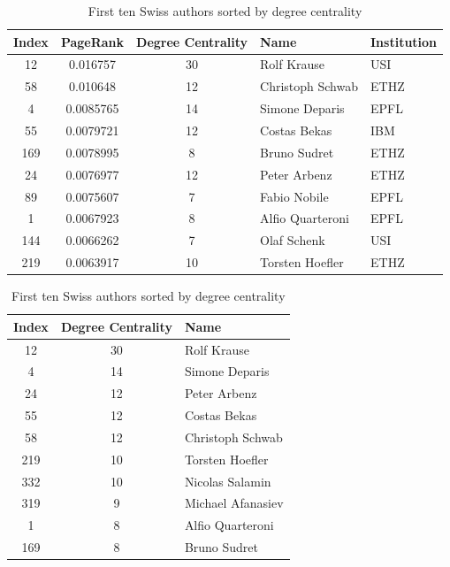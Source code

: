 \documentclass[]{usiinfbachelorproject}
\begin{document}
\begin{table}[h!]
\begin{minipage}[b]{.5\linewidth}
\tiny
\begin{tabular*}{\textwidth}{c c c l l}
\textbf{Index} & \textbf{PageRank} & \textbf{Degree Centrality} & \textbf{Name} & \textbf{Institution}\\
\hline
12 & 0.016757 & 30 & Rolf Krause & USI \\
58 & 0.010648 & 12 & Christoph Schwab & ETHZ \\
4 & 0.0085765 & 14 & Simone Deparis & EPFL \\
55 & 0.0079721 & 12 & Costas Bekas & IBM \\
169 & 0.0078995 & 8 & Bruno Sudret & ETHZ \\
24 & 0.0076977 & 12 & Peter Arbenz & ETHZ \\
89 & 0.0075607 & 7 & Fabio Nobile & EPFL \\
1 & 0.0067923 & 8 & Alfio Quarteroni & EPFL \\
144 & 0.0066262 & 7 & Olaf Schenk & USI \\
219 & 0.0063917 & 10 & Torsten Hoefler & ETHZ
\end{tabular*}
\label{table:PR}
\caption{First ten Swiss authors sorted by PageRank}
\end{minipage}
\begin{minipage}[b]{.5\linewidth}
\tiny
\centering
\begin{tabular}{c c l}
\textbf{Index} & \textbf{Degree Centrality} & \textbf{Name} \\
\hline
12 & 30 & Rolf Krause \\
4 & 14 & Simone Deparis \\
24 & 12 & Peter Arbenz \\
55 &12 & Costas Bekas \\
58 & 12 & Christoph Schwab \\
219 & 10 & Torsten Hoefler \\
332 & 10 & Nicolas Salamin \\
319 & 9 & Michael Afanasiev \\
1& 8 & Alfio Quarteroni \\
169 & 8 & Bruno Sudret
\end{tabular}
\label{table:DC}
\caption{First ten Swiss authors sorted by degree centrality}
\end{minipage}
\end{table}
\end{document}
